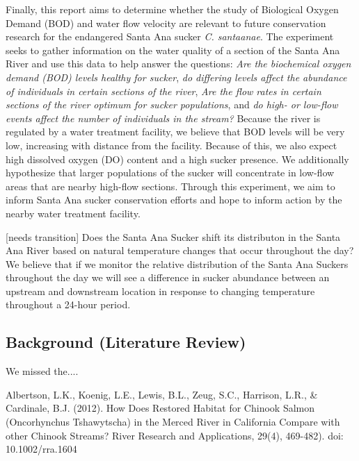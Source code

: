 \documentclass{article}\usepackage[]{graphicx}\usepackage[]{color}
\begin{document}
Finally, this report aims to determine whether the study of Biological Oxygen Demand (BOD) and water flow velocity are relevant to future conservation research for the endangered Santa Ana sucker \emph{C. santaanae}. The experiment seeks to gather information on the water quality of a section of the Santa Ana River and use this data to help answer the questions: \emph{Are the biochemical oxygen demand (BOD) levels healthy for sucker}, \emph{do differing levels affect the  abundance of individuals in certain sections of the river}, \emph{Are the flow rates in certain sections of the river optimum for sucker populations}, and \emph{do high- or low-flow events affect the number of individuals in the stream?} Because the river is regulated by a water treatment facility, we believe that BOD levels will be very low, increasing with distance from the facility. Because of this, we also expect high dissolved oxygen (DO) content and a high sucker presence. We additionally hypothesize that larger populations of the sucker will concentrate in low-flow areas that are nearby high-flow sections. Through this experiment, we aim to inform Santa Ana sucker conservation efforts and hope to inform action by the nearby water treatment facility. 


[needs transition] Does the Santa Ana Sucker shift its distributon in the Santa Ana River based on natural temperature changes that occur throughout the day? We believe that if we monitor the relative distribution of the Santa Ana Suckers throughout the day we will see a difference in sucker abundance between an upstream and downstream location in response to changing temperature throughout a 24-hour period.

\subsection{Background (Literature Review)}

We missed the....

Albertson, L.K., Koenig, L.E., Lewis, B.L., Zeug, S.C., Harrison, L.R., \& Cardinale, B.J. (2012). How Does Restored Habitat for Chinook Salmon (Oncorhynchus Tshawytscha) in the Merced River in California Compare with other Chinook Streams? River Research and Applications, 29(4), 469-482). doi: 10.1002/rra.1604
\end{document}
